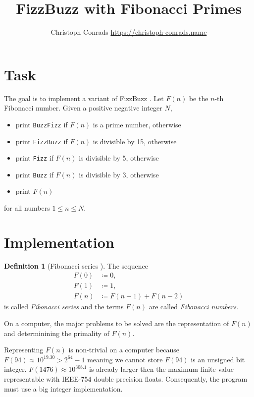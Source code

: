 \documentclass[%
	paper=a4,
	fontsize=10pt,
	DIV11,BCOR10mm,
	numbers=noenddot,
	abstract=yes
]{scrartcl}
\title{FizzBuzz with Fibonacci Primes}
\author{Christoph Conrads {\small \url{https://christoph-conrads.name}}}
\theoremstyle{definition}
\newtheorem{definition}{Definition}[section]
\begin{document}
\maketitle



\section{Task}

The goal is to implement a variant of FizzBuzz \cite{Atwood2007}. Let $F(n)$ be
the $n$-th Fibonacci number. Given a positive negative integer $N$,
\begin{itemize}
	\item print \texttt{BuzzFizz} if $F(n)$ is a prime number, otherwise
	\item print \texttt{FizzBuzz} if $F(n)$ is divisible by 15, otherwise
	\item print \texttt{Fizz} if $F(n)$ is divisible by 5, otherwise
	\item print \texttt{Buzz} if $F(n)$ is divisible by 3, otherwise
	\item print $F(n)$
\end{itemize}
for all numbers $1 \leq n \leq N$.



\section{Implementation}

\begin{definition}[Fibonacci series {\cite[§2]{Hoggatt1969}}]
	The sequence
	\begin{align*}
		F(0) &\coloneqq 0, \\
		F(1) &\coloneqq 1, \\
		F(n) &\coloneqq F(n-1) + F(n-2)
	\end{align*}
	is called \emph{Fibonacci series} and the terms $F(n)$ are called
	\emph{Fibonacci numbers}.
\end{definition}

On a computer, the major problems to be solved are the representation of $F(n)$
and determinining the primality of $F(n)$.

Representing $F(n)$ is non-trivial on a computer because $F(94) \approx
10^{19.30} > 2^{64} - 1$ meaning we cannot store $F(94)$ is an unsigned
\unit[64]{bit} integer. $F(1476) \approx 10^{308.1}$ is already larger then the
maximum finite value representable with IEEE-754 double precision floats.
Consequently, the program must use a big integer implementation.
\end{document}
